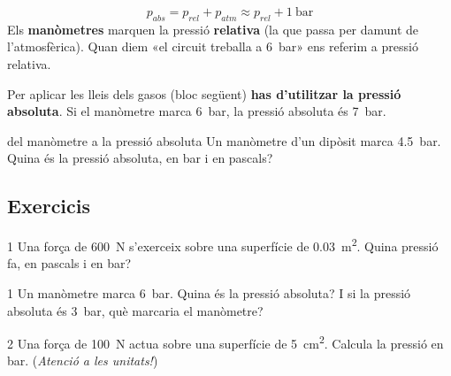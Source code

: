 \begin{idea}
\[ p_{abs} = p_{rel} + p_{atm} \approx p_{rel} + \SI{1}{\bar} \]
Els \textbf{manòmetres} marquen la pressió \textbf{relativa} (la que passa per damunt de l'atmosfèrica). Quan diem «el circuit treballa a \SI{6}{\bar}» ens referim a pressió relativa.
\end{idea}

\begin{atencio}
Per aplicar les lleis dels gasos (bloc següent) \textbf{has d'utilitzar la pressió absoluta}. Si el manòmetre marca \SI{6}{\bar}, la pressió absoluta és \SI{7}{\bar}.
\end{atencio}

\begin{guiada}{del manòmetre a la pressió absoluta}
Un manòmetre d'un dipòsit marca \SI{4,5}{\bar}. Quina és la pressió absoluta, en bar i en pascals?
\end{guiada}

\subsection*{Exercicis}

\begin{exercici}{1}
Una força de \SI{600}{\newton} s'exerceix sobre una superfície de \SI{0,03}{\meter\squared}. Quina pressió fa, en pascals i en bar?
\end{exercici}

\begin{exercici}{1}
Un manòmetre marca \SI{6}{\bar}. Quina és la pressió absoluta? I si la pressió absoluta és \SI{3}{\bar}, què marcaria el manòmetre?
\end{exercici}

\begin{exercici}{2}
Una força de \SI{100}{\newton} actua sobre una superfície de \SI{5}{\centi\meter\squared}. Calcula la pressió en bar. (\emph{Atenció a les unitats!})
\end{exercici}

